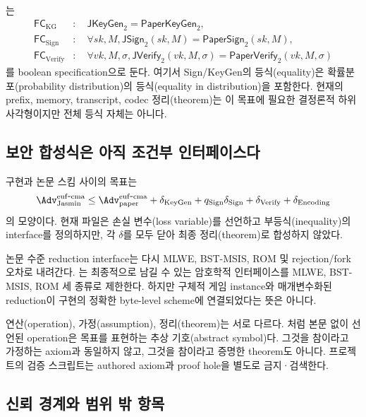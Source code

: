 는
\begin{align*}
  \mathsf{FC}_{\mathrm{KG}}
    &:\quad \mathsf{JKeyGen}_2=\mathsf{PaperKeyGen}_2,\\
  \mathsf{FC}_{\mathrm{Sign}}
    &:\quad \forall sk,M,
      \mathsf{JSign}_2(sk,M)=\mathsf{PaperSign}_2(sk,M),\\
  \mathsf{FC}_{\mathrm{Verify}}
    &:\quad \forall vk,M,\sigma,
      \mathsf{JVerify}_2(vk,M,\sigma)
      =\mathsf{PaperVerify}_2(vk,M,\sigma)
\end{align*}
를 boolean specification으로 둔다. 여기서 Sign/KeyGen의 등식(equality)은
확률분포(probability distribution)의 등식(equality in distribution)을 포함한다.
현재의 prefix, memory, transcript, codec 정리(theorem)는 이 목표에
필요한 결정론적 하위 사각형이지만 전체 등식 자체는 아니다.

\subsection{보안 합성식은 아직 조건부 인터페이스다}

구현과 논문 스킴 사이의 목표는
\[
  \Adv^{\mathrm{euf\mbox{-}cma}}_{\mathrm{Jasmin}}
  \le
  \Adv^{\mathrm{euf\mbox{-}cma}}_{\mathrm{paper}}
  +\delta_{\mathrm{KeyGen}}
  +q_{\mathrm{Sign}}\delta_{\mathrm{Sign}}
  +\delta_{\mathrm{Verify}}
  +\delta_{\mathrm{Encoding}}
\]
의 모양이다. 현재 파일은 손실 변수(loss variable)를 선언하고
부등식(inequality)의 interface를 정의하지만,
각 \(\delta\)를 모두 닫아 최종 정리(theorem)로 합성하지 않았다.

논문 수준 reduction interface는 다시 MLWE, BST-MSIS, ROM 및 rejection/fork
오차로 내려간다. 는 최종적으로 남길 수 있는
암호학적 인터페이스를 MLWE, BST-MSIS, ROM 세 종류로 제한한다. 하지만 구체적
게임 instance와 매개변수화된 reduction이 구현의 정확한 byte-level scheme에
연결되었다는 뜻은 아니다.

\begin{caution}[선언 종류의 구분]
연산(operation), 가정(assumption), 정리(theorem)는 서로 다르다.
처럼 본문 없이 선언된 operation은
목표를 표현하는 추상 기호(abstract symbol)다. 그것을 참이라고 가정하는 axiom과 동일하지
않고, 그것을 참이라고 증명한 theorem도 아니다. 프로젝트의 검증 스크립트는
authored axiom과 proof hole을 별도로 금지·검색한다.
\end{caution}

\subsection{신뢰 경계와 범위 밖 항목}

